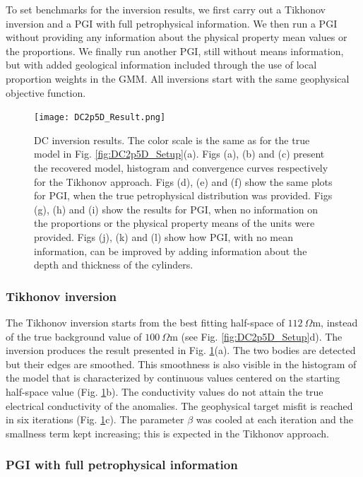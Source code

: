 \documentclass[extra]{gji} %
\begin{document}
To set benchmarks for the inversion results, we first carry out a Tikhonov inversion and a PGI with full petrophysical information. We then run a PGI without providing any information about the physical property mean values or the proportions. We finally run another PGI, still without means information, but with added geological information included through the use of local proportion weights in the GMM. All inversions start with the same geophysical objective function.

\begin{figure}
\centering
\texttt{[image: DC2p5D\_Result.png]}
\caption{DC inversion results. The color scale is the same as for the true model in Fig. \ref{fig:DC2p5D_Setup}(a). Figs (a), (b) and (c) present the recovered model, histogram and convergence curves respectively for the Tikhonov approach. Figs (d), (e) and (f) show the same plots for PGI, when the true petrophysical distribution was provided. Figs (g), (h) and (i) show the results for PGI, when no information on the proportions or the physical property means of the units were provided. Figs (j), (k) and (l) show how PGI, with no mean information, can be improved by adding information about the  depth and thickness of the cylinders.}
\label{fig:DC2p5D_Result}
\end{figure}

\subsubsection{Tikhonov inversion}

The Tikhonov inversion starts from the best fitting half-space of $112~\Omega \text{m}$, instead of the true background value of $100~\Omega \text{m}$ (see Fig. \ref{fig:DC2p5D_Setup}d). The inversion produces the result presented in Fig. \ref{fig:DC2p5D_Result}(a). The two bodies are detected but their edges are smoothed. This smoothness is also visible in the histogram of the model that is characterized by continuous values centered on the starting half-space value (Fig. \ref{fig:DC2p5D_Result}b). The conductivity values do not attain the true electrical conductivity of the anomalies. The geophysical target misfit is reached in six iterations (Fig. \ref{fig:DC2p5D_Result}c). The parameter $\beta$ was cooled at each iteration and the smallness term kept increasing; this is expected in the Tikhonov approach.


\subsubsection{PGI with full petrophysical information}
\end{document}
